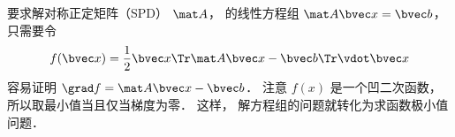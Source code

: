 

要求解对称正定矩阵（SPD） $\mat A$， 的线性方程组 $\mat A \bvec x = \bvec b$， 只需要令
\begin{equation}
f(\bvec x) = \frac{1}{2}\bvec x\Tr \mat A\bvec x - \bvec b\Tr \vdot \bvec x
\end{equation}
容易证明 $\grad f = \mat A \bvec x - \bvec b$． 注意 $f(x)$ 是一个凹二次函数， 所以取最小值当且仅当梯度为零． 这样， 解方程组的问题就转化为求函数极小值问题．